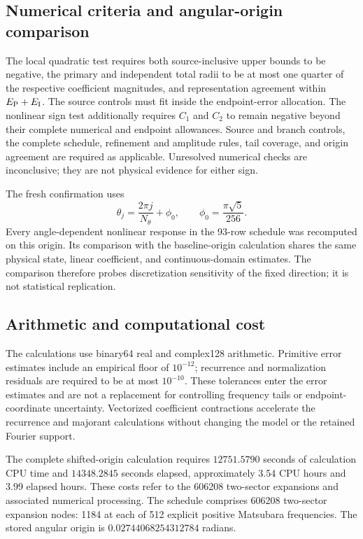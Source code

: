 \subsection{Numerical criteria and angular-origin comparison}
The local quadratic test requires both source-inclusive upper bounds to be negative, the primary and independent total radii to be at most one quarter of the respective coefficient magnitudes, and representation agreement within $E_{\mathrm P}+E_{\mathrm{I}}$. The source controls must fit inside the endpoint-error allocation. The nonlinear sign test additionally requires $C_1$ and $C_2$ to remain negative beyond their complete numerical and endpoint allowances. Source and branch controls, the complete schedule, refinement and amplitude rules, tail coverage, and origin agreement are required as applicable. Unresolved numerical checks are inconclusive; they are not physical evidence for either sign.

The fresh confirmation uses
\begin{equation}\label{eq:origin}
 \theta_j=\frac{2\pi j}{N_\theta}+\phi_0,\qquad
 \phi_0=\frac{\pi\sqrt5}{256}.
\end{equation}
Every angle-dependent nonlinear response in the 93-row schedule was recomputed on this origin. Its comparison with the baseline-origin calculation shares the same physical state, linear coefficient, and continuous-domain estimates. The comparison therefore probes discretization sensitivity of the fixed direction; it is not statistical replication.

\subsection{Arithmetic and computational cost}
The calculations use binary64 real and complex128 arithmetic. Primitive error estimates include an empirical floor of $10^{-12}$; recurrence and normalization residuals are required to be at most $10^{-10}$. These tolerances enter the error estimates and are not a replacement for controlling frequency tails or endpoint-coordinate uncertainty. Vectorized coefficient contractions accelerate the recurrence and majorant calculations without changing the model or the retained Fourier support.

The complete shifted-origin calculation requires $12751.5790$ seconds of calculation CPU time and $14348.2845$ seconds elapsed, approximately 3.54 CPU hours and 3.99 elapsed hours. These costs refer to the 606208 two-sector expansions and associated numerical processing. The schedule comprises 606208 two-sector expansion nodes: 1184 at each of 512 explicit positive Matsubara frequencies. The stored angular origin is $0.02744068254312784$ radians.
